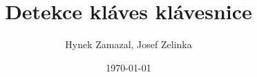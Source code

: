 \documentclass[aspectratio=169]{beamer}
\author[H. Zamazal, J. Zelinka]{Hynek Zamazal, Josef Zelinka}
\title{Detekce kláves klávesnice}
\date{\today}
\begin{document}
\begin{frame}
\titlepage
\end{frame}


\end{document}
